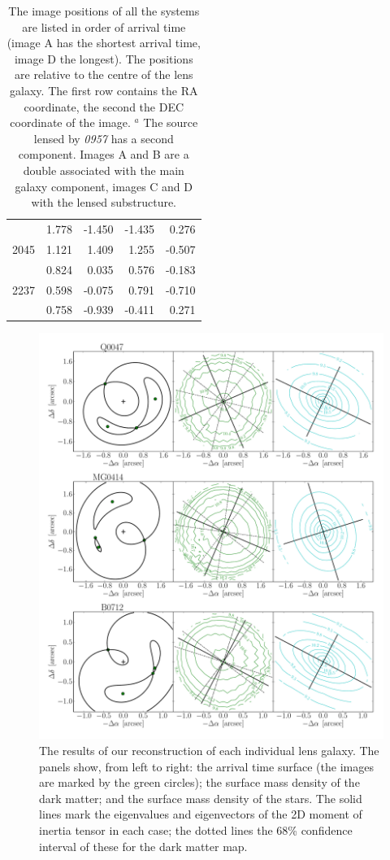 \documentclass[useAMS,usenatbib]{mn2e}
\begin{document}
\begin{table}
\begin{center}
\begin{tabular}{l r r r r}
           & 1.778 & -1.450 & -1.435 & 0.276 \\
      2045 & 1.121 & 1.409 & 1.255 & -0.507 \\
           & 0.824 & 0.035 & 0.576 & -0.183 \\
      2237 & 0.598 & -0.075 & 0.791 & -0.710 \\
           & 0.758 & -0.939 & -0.411 & 0.271 \\
    \end{tabular}
    \caption[width=\linewidth]{The image positions of all the systems are listed in order of arrival time (image A has the shortest arrival time, image D the longest). The positions are relative to the centre of the lens galaxy. The first row contains the RA coordinate, the second the DEC coordinate of the image. \newline $^{a}$ The source lensed by {\it0957} has a second component. Images A and B are a double associated with the main galaxy component, images C and D with the lensed substructure.}
    \label{tab:lenspositions}
  \end{center}
\end{table}

\begin{figure}
  \centering
  \includegraphics[width=.8\linewidth]{Figures/AllLenses31.pdf}
  \caption[width=.65\linewidth]{The results of our reconstruction of each individual lens galaxy. The panels show, from left to right: the arrival time surface (the images are marked by the green circles); the surface mass density of the dark matter; and the surface mass density of the stars. The solid lines mark the eigenvalues and eigenvectors of the 2D moment of inertia tensor in each case; the dotted lines the 68\% confidence interval of these for the dark matter map.}
  \label{fig:lensreconstruction1}
\end{figure}
\end{document}
